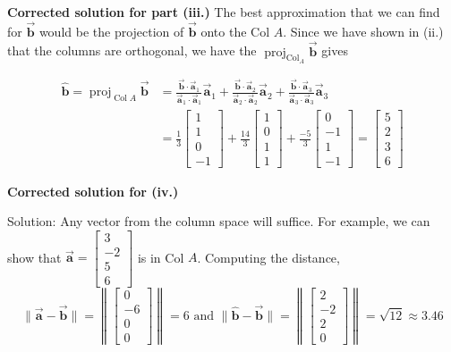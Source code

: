 \documentclass[letter,11pt]{article}
\theoremstyle{definition}
\begin{document}
\begin{tcolorbox}[boxrule=1mm,enhanced jigsaw, breakable,before=\hfill,after=\hfill,adjusted title={Problem 5 solutions}]
    \textbf{Corrected solution for part (iii.)}
The best approximation that we can find for $\vec{\boldsymbol{b}}$ would be the projection of $\vec{\boldsymbol{b}}$ onto the Col $A$. Since we have shown in (ii.) that the columns are orthogonal, we have the $\operatorname{proj}_{\operatorname{Col}_A} \vec{\boldsymbol{b}}$ gives

\begin{align*}
\hat{\boldsymbol{b}}=\operatorname{proj}_{\operatorname{Col } A} \vec{\boldsymbol{b}} & =\frac{\vec{\boldsymbol{b}} \cdot \vec{\boldsymbol{a}}_1}{\vec{\boldsymbol{a}}_1 \cdot \vec{\boldsymbol{a}}_1} \vec{\boldsymbol{a}}_1+\frac{\vec{\boldsymbol{b}} \cdot \vec{\boldsymbol{a}}_2}{\vec{\boldsymbol{a}}_2 \cdot \vec{\boldsymbol{a}}_2} \vec{\boldsymbol{a}}_2+\frac{\vec{\boldsymbol{b}} \cdot \vec{\boldsymbol{a}}_3}{\vec{\boldsymbol{a}}_3 \cdot \vec{\boldsymbol{a}}_3} \vec{\boldsymbol{a}}_3 \\
& =\frac{1}{3}\begin{bmatrix}
1 \\
1 \\
0 \\
-1
\end{bmatrix}+\frac{14}{3}\begin{bmatrix}
1 \\
0 \\
1 \\
1
\end{bmatrix}+\frac{-5}{3}\begin{bmatrix}
0 \\
-1 \\
1 \\
-1
\end{bmatrix}=\begin{bmatrix}
5 \\
2 \\
3 \\
6
\end{bmatrix}
\end{align*}

\textbf{Corrected solution for (iv.)}

Solution: Any vector from the column space will suffice. For example, we can show that $\vec{\boldsymbol{a}}=\begin{bmatrix}3 \\ -2 \\ 5 \\ 6\end{bmatrix}$ is in Col $A$. Computing the distance,
$$
\|\vec{\boldsymbol{a}}-\vec{\boldsymbol{b}}\|=\left\|\begin{bmatrix}
0 \\
-6 \\
0 \\
0
\end{bmatrix}\right\|=6 \text { and }\|\hat{\boldsymbol{b}}-\vec{\boldsymbol{b}}\|=\left\|\begin{bmatrix}
2 \\
-2 \\
2 \\
0
\end{bmatrix}\right\|=\sqrt{12} \approx 3.46
$$
\end{tcolorbox}
\newpage


        
\end{document}

